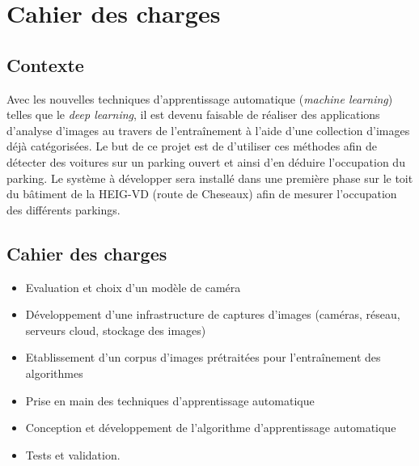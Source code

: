 \chapter*{Cahier des charges}

\section*{Contexte}
Avec les nouvelles techniques d'apprentissage automatique (\textit{machine learning}) telles que le \textit{deep learning}, il est devenu faisable de réaliser des applications d'analyse d'images au travers de l'entraînement à l'aide d'une collection d'images déjà catégorisées.
Le but de ce projet est de d'utiliser ces méthodes afin de détecter des voitures sur un parking ouvert et ainsi d'en déduire l'occupation du parking.
Le système à développer sera installé dans une première phase sur le toit du bâtiment de la HEIG-VD (route de Cheseaux) afin de mesurer l'occupation des différents parkings.

\section*{Cahier des charges}

\begin{itemize}
    \item Evaluation et choix d'un modèle de caméra
    \item Développement d'une infrastructure de captures d'images (caméras, réseau, serveurs cloud, stockage des images)
    \item Etablissement d'un corpus d'images prétraitées pour l'entraînement des algorithmes
    \item Prise en main des techniques d'apprentissage automatique
    \item Conception et développement de l'algorithme d'apprentissage automatique
    \item Tests et validation.
\end{itemize}